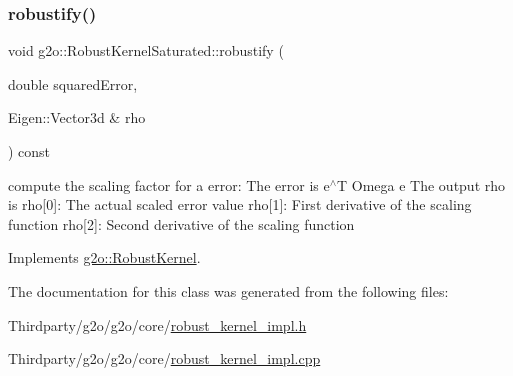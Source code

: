 \subsubsection{\texorpdfstring{robustify()}{robustify()}}
{\footnotesize\ttfamily void g2o\+::\+Robust\+Kernel\+Saturated\+::robustify (\begin{DoxyParamCaption}\item[{double}]{squared\+Error,  }\item[{Eigen\+::\+Vector3d \&}]{rho }\end{DoxyParamCaption}) const\hspace{0.3cm}{\ttfamily [virtual]}}

compute the scaling factor for a error\+: The error is e$^\wedge$T Omega e The output rho is rho\mbox{[}0\mbox{]}\+: The actual scaled error value rho\mbox{[}1\mbox{]}\+: First derivative of the scaling function rho\mbox{[}2\mbox{]}\+: Second derivative of the scaling function 

Implements \mbox{\hyperlink{classg2o_1_1_robust_kernel_ab47b071a0cfe466be063f0104bc41d0f}{g2o\+::\+Robust\+Kernel}}.



The documentation for this class was generated from the following files\+:\begin{DoxyCompactItemize}
\item 
Thirdparty/g2o/g2o/core/\mbox{\hyperlink{robust__kernel__impl_8h}{robust\+\_\+kernel\+\_\+impl.\+h}}\item 
Thirdparty/g2o/g2o/core/\mbox{\hyperlink{robust__kernel__impl_8cpp}{robust\+\_\+kernel\+\_\+impl.\+cpp}}\end{DoxyCompactItemize}

